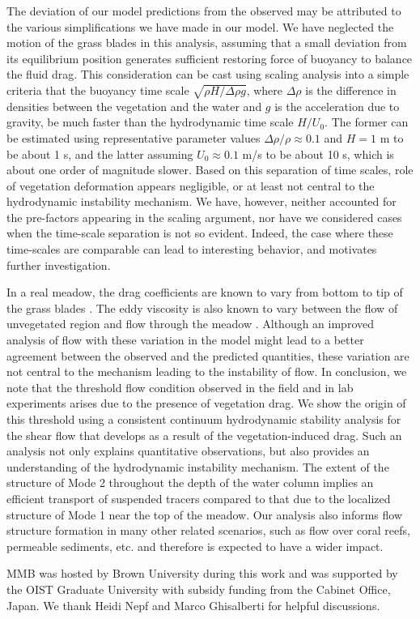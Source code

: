 \documentclass[aps,prl,twocolumn,superscriptaddress,10pt]{revtex4-1}  %
\begin{document}
\newline
The deviation of our model predictions from the observed may be attributed to the various simplifications we have made in our model. 
We have neglected the motion of the grass blades in this analysis, assuming that a small deviation from its equilibrium position generates sufficient restoring force of buoyancy to balance the fluid drag. 
This consideration can be cast using scaling analysis into a simple criteria that the buoyancy time scale $\sqrt{\rho H/\Delta \rho g}$, where $\Delta \rho$ is the difference in densities between the vegetation and the water and $g$ is the acceleration due to gravity, be much faster than the hydrodynamic time scale $H/U_0$.
The former can be estimated using representative parameter values $\Delta \rho /\rho \approx 0.1$ and $H=1$ m to be about 1 s, and the latter assuming $U_0 \approx 0.1$ m/s to be about 10 s, which is about one order of magnitude slower.
Based on this separation of time scales, role of vegetation deformation appears negligible, or at least not central to the hydrodynamic instability mechanism. 
We have, however, neither accounted for the pre-factors appearing in the scaling argument, nor have we considered cases when the time-scale separation is not so evident.
Indeed, the case where these time-scales are comparable can lead to interesting behavior\cite{Delangre06}, and motivates further investigation. 

In a real meadow, the drag coefficients are known to vary from bottom to tip of the grass blades \cite{Vivoni98,Nepf00}. 
The eddy viscosity is also known to vary between the flow of unvegetated region and flow through the meadow \cite{Ghisal02}. 
Although an improved analysis of flow with these variation in the model might lead to a better agreement between the observed and the predicted quantities, these variation are not central to the mechanism leading to the instability of flow.
\newline\newline
In conclusion, we note that the threshold flow condition observed in the field and in lab experiments arises due to the presence of vegetation drag. 
We show the origin of this threshold using a consistent continuum hydrodynamic stability analysis for the shear flow that develops as a result of the vegetation-induced drag. 
Such an analysis not only explains quantitative observations, but also provides an understanding of the hydrodynamic instability mechanism. 
The extent of the structure of Mode 2 throughout the depth of the water column implies an efficient transport of suspended tracers compared to that due to the localized structure of Mode 1 near the top of the meadow. 
Our analysis also informs flow structure formation in many other related scenarios, such as flow over coral reefs, permeable sediments, etc. and therefore is expected to have a wider impact.

\acknowledgments
MMB was hosted by Brown University during this work and was supported by the OIST Graduate University with subsidy funding from the Cabinet Office, Japan. We thank Heidi Nepf and Marco Ghisalberti for helpful discussions.

{}

\end{document}

